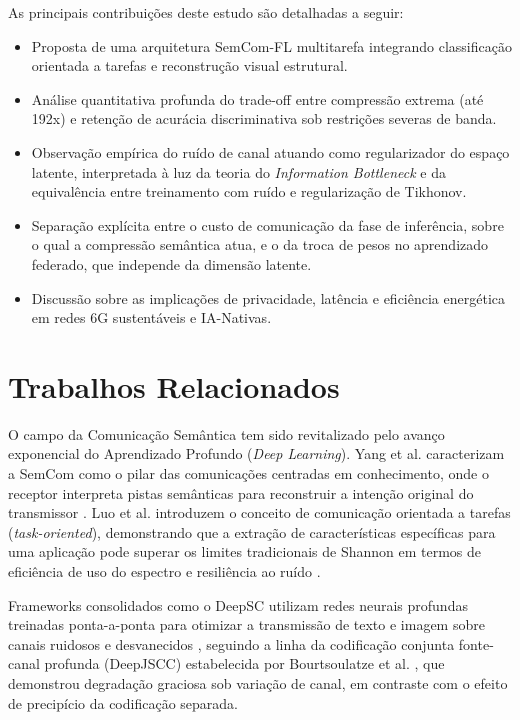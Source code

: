 \documentclass[conference]{IEEEtran}
\begin{document}
As principais contribuições deste estudo são detalhadas a seguir:
\begin{itemize}
    \item Proposta de uma arquitetura SemCom-FL multitarefa integrando classificação orientada a tarefas e reconstrução visual estrutural.
    \item Análise quantitativa profunda do trade-off entre compressão extrema (até 192x) e retenção de acurácia discriminativa sob restrições severas de banda.
    \item Observação empírica do ruído de canal atuando como regularizador do espaço latente, interpretada à luz da teoria do \textit{Information Bottleneck} e da equivalência entre treinamento com ruído e regularização de Tikhonov.
    \item Separação explícita entre o custo de comunicação da fase de inferência, sobre o qual a compressão semântica atua, e o da troca de pesos no aprendizado federado, que independe da dimensão latente.
    \item Discussão sobre as implicações de privacidade, latência e eficiência energética em redes 6G sustentáveis e IA-Nativas.
\end{itemize}

\section{Trabalhos Relacionados}

O campo da Comunicação Semântica tem sido revitalizado pelo avanço exponencial do Aprendizado Profundo (\textit{Deep Learning}). Yang et al. caracterizam a SemCom como o pilar das comunicações centradas em conhecimento, onde o receptor interpreta pistas semânticas para reconstruir a intenção original do transmissor \cite{yang2022semantic}. Luo et al. introduzem o conceito de comunicação orientada a tarefas (\textit{task-oriented}), demonstrando que a extração de características específicas para uma aplicação pode superar os limites tradicionais de Shannon em termos de eficiência de uso do espectro e resiliência ao ruído \cite{luo2022semantic}.

Frameworks consolidados como o DeepSC utilizam redes neurais profundas treinadas ponta-a-ponta para otimizar a transmissão de texto e imagem sobre canais ruidosos e desvanecidos \cite{xie2021deep}, seguindo a linha da codificação conjunta fonte-canal profunda (DeepJSCC) estabelecida por Bourtsoulatze et al. \cite{bourtsoulatze2019deep}, que demonstrou degradação graciosa sob variação de canal, em contraste com o efeito de precipício da codificação separada.
\end{document}
